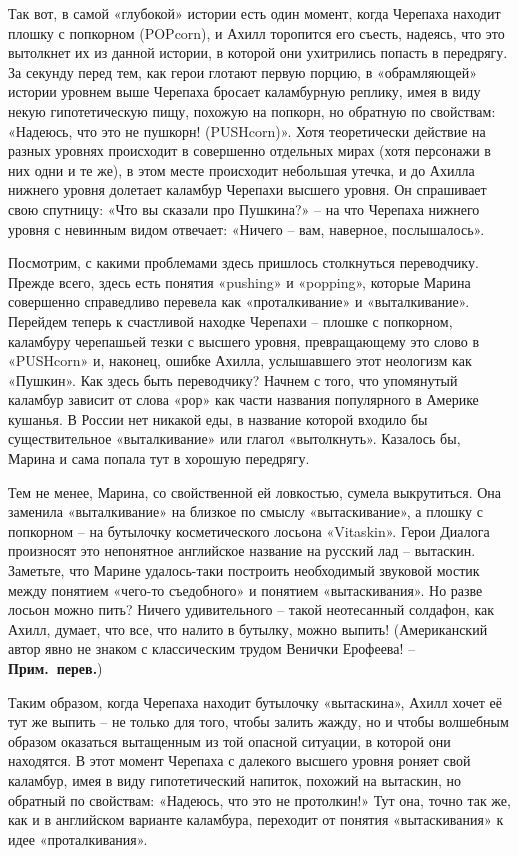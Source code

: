 \documentclass[../main.tex]{subfiles}
\begin{document}
Так вот, в самой «глубокой» истории есть один момент, когда Черепаха находит плошку с попкорном (POPcorn), и Ахилл торопится его съесть, надеясь, что это вытолкнет их из данной истории, в которой они ухитрились попасть в передрягу. За секунду перед тем, как герои глотают первую порцию, в «обрамляющей» истории уровнем выше Черепаха бросает каламбурную реплику, имея в виду некую гипотетическую пищу, похожую на попкорн, но обратную по свойствам: «Надеюсь, что это не пушкорн! (PUSHcorn)». Хотя теоретически действие на разных уровнях происходит в совершенно отдельных мирах (хотя персонажи в них одни и те же), в этом месте происходит небольшая утечка, и до Ахилла нижнего уровня долетает каламбур Черепахи высшего уровня. Он спрашивает свою спутницу: «Что вы сказали про Пушкина?» \--- на что Черепаха нижнего уровня с невинным видом отвечает: «Ничего \--- вам, наверное, послышалось».

Посмотрим, с какими проблемами здесь пришлось столкнуться переводчику. Прежде всего, здесь есть понятия «pushing» и «popping», которые Марина совершенно справедливо перевела как «проталкивание» и «выталкивание». Перейдем теперь к счастливой находке Черепахи \--- плошке с попкорном, каламбуру черепашьей тезки с высшего уровня, превращающему это слово в «PUSHcorn» и, наконец, ошибке Ахилла, услышавшего этот неологизм как «Пушкин». Как здесь быть переводчику? Начнем с того, что упомянутый каламбур зависит от слова «рор» как части названия популярного в Америке кушанья. В России нет никакой еды, в название которой входило бы существительное «выталкивание» или глагол «вытолкнуть». Казалось бы, Марина и сама попала тут в хорошую передрягу.

Тем не менее, Марина, со свойственной ей ловкостью, сумела выкрутиться. Она заменила «выталкивание» на близкое по смыслу «вытаскивание», а плошку с попкорном \--- на бутылочку косметического лосьона «Vitaskin». Герои Диалога произносят это непонятное английское название на русский лад \--- вытаскин. Заметьте, что Марине удалось-таки построить необходимый звуковой мостик между понятием «чего-то съедобного» и понятием «вытаскивания». Но разве лосьон можно пить? Ничего удивительного \--- такой неотесанный солдафон, как Ахилл, думает, что все, что налито в бутылку, можно выпить! (Американский автор явно не знаком с классическим трудом Венички Ерофеева! \--- \textbf{Прим.~перев.})

Таким образом, когда Черепаха находит бутылочку «вытаскина», Ахилл хочет её тут же выпить \--- не только для того, чтобы залить жажду, но и чтобы волшебным образом оказаться вытащенным из той опасной ситуации, в которой они находятся. В этот момент Черепаха с далекого высшего уровня роняет свой каламбур, имея в виду гипотетический напиток, похожий на вытаскин, но обратный по свойствам: «Надеюсь, что это не протолкин!» Тут она, точно так же, как и в английском варианте каламбура, переходит от понятия «вытаскивания» к идее «проталкивания».
\end{document}
